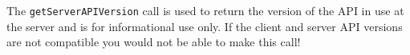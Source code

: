 The \verb+getServerAPIVersion+ call is used to return the version of the API in use at the
server and is for informational use only. If the client and server API versions are not compatible
you would not be able to make this call!
